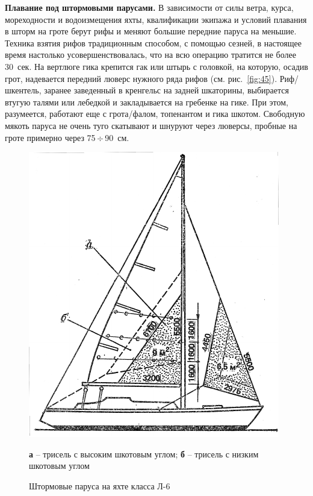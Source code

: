 \documentclass[a4paper, 12pt, twoside, final, book, russian, fittopage, cyremdash]{ncc}
\newcommand{\otdo}{\,\ensuremath{\div}\,}
\newcommand{\ris}[1]{\ref{fig:#1}}
\begin{document}
\textbf{Плавание под штормовыми парусами.} В зависимости от силы ветра, курса, мореходности и водоизмещения яхты, квалификации экипажа и условий плавания в шторм на гроте берут рифы и меняют большие передние паруса на меньшие. Техника взятия рифов традиционным способом, с помощью сезней, в настоящее время настолько усовершенствовалась, что на всю операцию тратится не более 30~сек. На вертлюге гика крепится гак или штырь с головкой, на которую, осадив грот, надевается передний люверс нужного ряда рифов (см. рис.~\ris{45}). Риф\-/шкентель, заранее заведенный в кренгельс на задней шкаторины, выбирается втугую талями или лебедкой и закладывается на гребенке на гике. При этом, разумеется, работают еще с грота\-/фалом, топенантом и гика шкотом. Свободную мякоть паруса не очень туго скатывают и шнуруют через люверсы, пробные на гроте примерно через 75\otdo 90~см. 

\begin{figure}[htb]
  \centering{}
  \includegraphics[scale=1.2]{0130P}
  \caption{Штормовые паруса на яхте класса Л-6}
  \label{fig:130}
  \small
  \centering{}
  \textbf{а} \--- трисель с высоким шкотовым углом; \textbf{б} \--- трисель с низким шкотовым углом
\end{figure}
\end{document}
